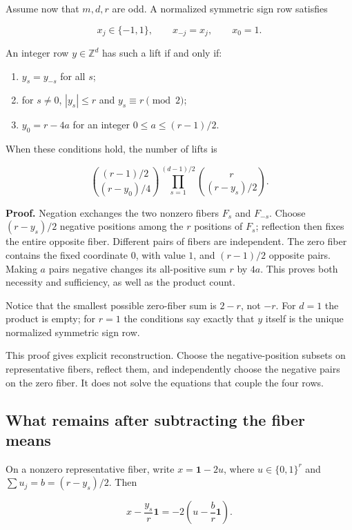 \documentclass[
  11pt,
]{article}
\providecommand{\tightlist}{%
  \setlength{\itemsep}{0pt}\setlength{\parskip}{0pt}}
\begin{document}
Assume now that \(m,d,r\) are odd. A normalized symmetric sign row
satisfies

\[x_j\in\{-1,1\},\qquad x_{-j}=x_j,\qquad x_0=1.\]

An integer row \(y\in\mathbb Z^d\) has such a lift if and only if:

\begin{enumerate}
\def\labelenumi{\arabic{enumi}.}
\tightlist
\item
  \(y_s=y_{-s}\) for all \(s\);
\item
  for \(s\ne0\), \(|y_s|\le r\) and \(y_s\equiv r\pmod2\);
\item
  \(y_0=r-4a\) for an integer \(0\le a\le(r-1)/2\).
\end{enumerate}

When these conditions hold, the number of lifts is

\[
\binom{(r-1)/2}{(r-y_0)/4}
\prod_{s=1}^{(d-1)/2}\binom r{(r-y_s)/2}.
\]

\textbf{Proof.} Negation exchanges the two nonzero fibers \(F_s\) and
\(F_{-s}\). Choose \((r-y_s)/2\) negative positions among the \(r\)
positions of \(F_s\); reflection then fixes the entire opposite fiber.
Different pairs of fibers are independent. The zero fiber contains the
fixed coordinate \(0\), with value \(1\), and \((r-1)/2\) opposite
pairs. Making \(a\) pairs negative changes its all-positive sum \(r\) by
\(4a\). This proves both necessity and sufficiency, as well as the
product count.

Notice that the smallest possible zero-fiber sum is \(2-r\), not \(-r\).
For \(d=1\) the product is empty; for \(r=1\) the conditions say exactly
that \(y\) itself is the unique normalized symmetric sign row.

This proof gives explicit reconstruction. Choose the negative-position
subsets on representative fibers, reflect them, and independently choose
the negative pairs on the zero fiber. It does not solve the equations
that couple the four rows.

\subsection{What remains after subtracting the fiber
means}\label{what-remains-after-subtracting-the-fiber-means}

On a nonzero representative fiber, write \(x=\mathbf1-2u\), where
\(u\in\{0,1\}^r\) and \(\sum u_j=b=(r-y_s)/2\). Then

\[x-\frac{y_s}{r}\mathbf1
 =-2\left(u-\frac br\mathbf1\right).\]
\end{document}
